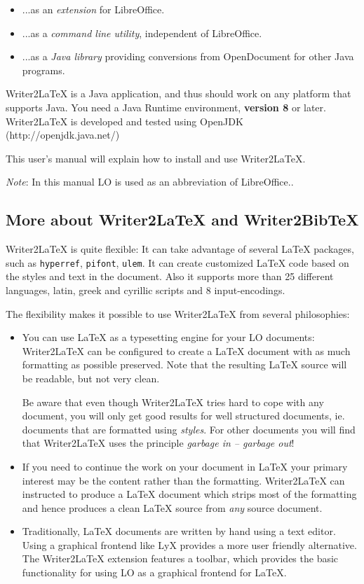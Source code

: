 \documentclass{article}
\newcommand\textstyleInternetlink[1]{#1}
\newcommand\textstyleSourceText[1]{\texttt{\textmd{#1}}}
\newcommand\liststyleLii{%
\renewcommand\labelitemi{${\bullet}$}
\renewcommand\labelitemii{${\circ}$}
\renewcommand\labelitemiii{${\blacksquare}$}
\renewcommand\labelitemiv{${\bullet}$}
}
\newcommand\liststyleLiii{%
\renewcommand\labelitemi{${\bullet}$}
\renewcommand\labelitemii{${\circ}$}
\renewcommand\labelitemiii{${\blacksquare}$}
\renewcommand\labelitemiv{${\bullet}$}
}
\begin{document}
\liststyleLii
\begin{itemize}
\item ...as an \emph{extension} for LibreOffice.
\item ...as a \emph{command line utility}, independent of LibreOffice.
\item ...as a \emph{Java library} providing conversions from OpenDocument for other Java programs.
\end{itemize}
{\mdseries
Writer2LaTeX is a Java application, and thus should work on any platform that supports Java. You need a Java Runtime environment, \textbf{version 8} or later. Writer2LaTeX is developed and tested using OpenJDK (\textstyleInternetlink{http://openjdk.java.net/})}

{\mdseries
This user's manual will explain how to install and use Writer2LaTeX.}

{\mdseries
\emph{Note}: In this manual LO is used as an abbreviation of LibreOffice..}

\subsection{More about Writer2LaTeX and Writer2BibTeX}
{\mdseries
Writer2LaTeX is quite flexible: It can take advantage of several LaTeX packages, such as \textstyleSourceText{hyperref}, \textstyleSourceText{pifont}, \textstyleSourceText{ulem}. It can create customized LaTeX code based on the styles and text in the document. Also it supports more than 25 different languages, latin, greek and cyrillic scripts and 8 input-encodings.}

{\mdseries
The flexibility makes it possible to use Writer2LaTeX from several philosophies:}

\liststyleLiii
\begin{itemize}
\item You can use LaTeX as a typesetting engine for your LO documents: Writer2LaTeX can be configured to create a LaTeX document with as much formatting as possible preserved. Note that the resulting LaTeX source will be readable, but not very clean.

Be aware that even though Writer2LaTeX tries hard to cope with any document, you will only get good results for well structured documents, ie. documents that are formatted using \emph{styles}. For other documents you will find that Writer2LaTeX uses the principle \emph{garbage in -- garbage out}!
\item If you need to continue the work on your document in LaTeX your primary interest may be the content rather than the formatting. Writer2LaTeX can instructed to produce a LaTeX document which strips most of the formatting and hence produces a clean LaTeX source from \emph{any} source document.
\item Traditionally, LaTeX documents are written by hand using a text editor. Using a graphical frontend like LyX provides a more user friendly alternative. The Writer2LaTeX extension features a toolbar, which provides the basic functionality for using LO as a graphical frontend for LaTeX.
\end{itemize}
\end{document}

